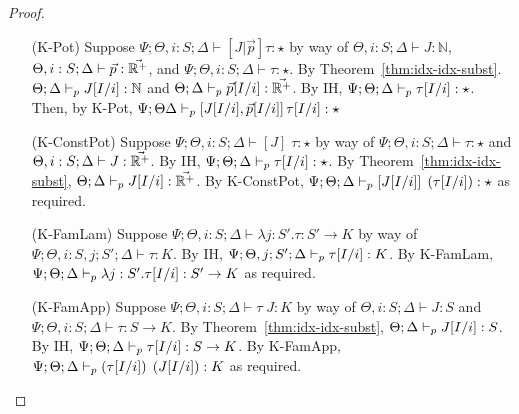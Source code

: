 \begin{proof}
\begin{enumerate}
  \item[(K-Pot)] Suppose
  $\Psi ; \Theta, i : S ; \Delta \vdash [J|\vec{p}] \tau : \star$
  by way of
  $\Theta, i : S ; \Delta \vdash J : \mathbb{N}$,
  $\Theta, i : S ; \Delta \vdash \vec{p} : \vec{\mathbb{R}^+}$, and
  $\Psi ; \Theta, i : S ; \Delta \vdash \tau : \star$.
  By Theorem~\ref{thm:idx-idx-subst}.
  $\Theta ; \Delta \vdash_p J[I/i] : \mathbb{N}$ and
  $\Theta ; \Delta \vdash_p \vec{p}[I/i] : \vec{\mathbb{R}^+}$.
  By IH,
  $\Psi ; \Theta ; \Delta \vdash_p \tau[I/i] : \star$.
  Then, by K-Pot,
  $\Psi ; \Theta  \Delta \vdash_p \left[J[I/i],\vec{p}[I/i]\right] \tau[I/i] : \star$
  
  \item[(K-ConstPot)] Suppose
  $\Psi ; \Theta, i : S ; \Delta \vdash [J] \; \tau : \star$
  by way of
  $\Psi ; \Theta, i : S ; \Delta \vdash \tau : \star$ and
  $\Theta, i : S ; \Delta \vdash J : \vec{\mathbb{R}^+}$.
  By IH,
  $\Psi ; \Theta ; \Delta \vdash_p \tau[I/i] : \star$.
  By Theorem~\ref{thm:idx-idx-subst},
  $\Theta ; \Delta \vdash_p J[I/i] : \vec{\mathbb{R}^+}$.
  By K-ConstPot,
  $\Psi ; \Theta ; \Delta \vdash_p \left[J[I/i]\right] \; \left(\tau[I/i]\right) : \star$
  as required.
  
  \item[(K-FamLam)] Suppose
  $\Psi ; \Theta, i : S ; \Delta \vdash \lambda j : S'. \tau : S' \to K$
  by way of
  $\Psi ; \Theta, i : S, j ; S' ; \Delta \vdash \tau : K$.
  By IH,
  $\Psi ; \Theta, j ; S' ; \Delta \vdash_p \tau[I/i] : K$.
  By K-FamLam,
  $\Psi ; \Theta ; \Delta \vdash_p \lambda j : S'.\tau[I/i] : S' \to K$
  as required.
  
  \item[(K-FamApp)] Suppose
  $\Psi ; \Theta, i : S ; \Delta \vdash \tau \; J : K$ by way of
  $\Theta, i : S ; \Delta \vdash J : S$ and
  $\Psi ; \Theta, i : S ; \Delta \vdash \tau : S \to K$.
  By Theorem~\ref{thm:idx-idx-subst},
  $\Theta ; \Delta \vdash_p J[I/i] : S$.
  By IH,
  $\Psi ; \Theta ; \Delta \vdash_p \tau[I/i] : S \to K$.
  By K-FamApp,
  $\Psi ; \Theta ; \Delta \vdash_p \left(\tau[I/i]\right) \; \left(J[I/i]\right) : K$
  as required.
  
\end{enumerate}
\end{proof}